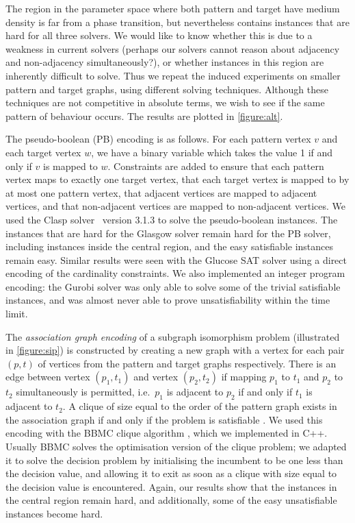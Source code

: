 \documentclass[twoside,11pt]{article}
\newcommand{\citep}[1]{\cite{#1}}
\begin{document}
The region in the parameter space where both pattern and target have medium density is far from a
phase transition, but nevertheless contains instances that are hard for all three solvers. We would
like to know whether this is due to a weakness in current solvers (perhaps our solvers cannot reason
about adjacency and non-adjacency simultaneously?), or whether instances in this region are
inherently difficult to solve.  Thus we repeat the induced experiments on smaller pattern and target
graphs, using different solving techniques.  Although these techniques are not competitive in
absolute terms, we wish to see if the same pattern of behaviour occurs. The results are plotted in
\cref{figure:alt}.

The pseudo-boolean (PB) encoding is as follows. For each pattern vertex $v$ and each target vertex
$w$, we have a binary variable which takes the value 1 if and only if $v$ is mapped to $w$.
Constraints are added to ensure that each pattern vertex maps to exactly one target vertex, that
each target vertex is mapped to by at most one pattern vertex, that adjacent vertices are mapped to
adjacent vertices, and that non-adjacent vertices are mapped to non-adjacent vertices. We used the
Clasp solver~\citep{gekakaosscsc11a} version 3.1.3 to solve the pseudo-boolean instances.  The
instances that are hard for the Glasgow solver remain hard for the PB solver, including instances
inside the central region, and the easy satisfiable instances remain easy. Similar results were seen
with the Glucose SAT solver \cite{glucose} using a direct encoding of the cardinality constraints.
We also implemented an integer program encoding: the Gurobi solver was only able to solve some of
the trivial satisfiable instances, and was almost never able to prove unsatisfiability within the
time limit.

The \emph{association graph encoding} of a subgraph isomorphism problem (illustrated in
\cref{figure:sip}) is constructed by creating a new graph with a vertex for each pair $(p, t)$ of
vertices from the pattern and target graphs respectively. There is an edge between vertex $(p_1,
t_1)$ and vertex $(p_2, t_2)$ if mapping $p_1$ to $t_1$ and $p_2$ to $t_2$ simultaneously is
permitted, i.e.\ $p_1$ is adjacent to $p_2$ if and only if $t_1$ is adjacent to $t_2$. A clique of
size equal to the order of the pattern graph exists in the association graph if and only if the
problem is satisfiable \citep{Levi:1973}. We used this encoding with the BBMC clique algorithm
\citep{SanSegundo:2011}, which we implemented in C++. Usually BBMC solves the optimisation version
of the clique problem; we adapted it to solve the decision problem by initialising the incumbent to
be one less than the decision value, and allowing it to exit as soon as a clique with size equal to
the decision value is encountered.  Again, our results show that the instances in the central region
remain hard, and additionally, some of the easy unsatisfiable instances become hard.
\end{document}
